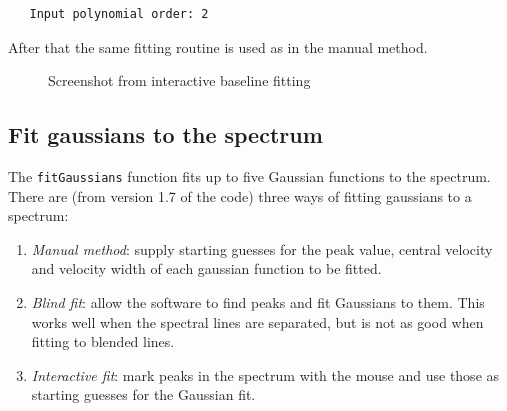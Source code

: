 \documentclass[11pt,a4paper]{article}
\begin{document}
\begin{lstlisting}
   Input polynomial order: 2
\end{lstlisting}
\noindent
After that the same fitting routine is used as in the manual method. 

\begin{figure}[h!]
  \centering
  \caption{Screenshot from interactive baseline fitting}
  \label{fig:interbaseline}
\end{figure}


\subsection{Fit gaussians to the spectrum}
\label{sec:fit-gauss-spectr}

The \texttt{fitGaussians} function fits up to five Gaussian functions
to the spectrum. There are (from version 1.7 of the code) three ways of
fitting gaussians to a spectrum:
\begin{enumerate}
\item \emph{Manual method}: supply starting guesses for the peak value,
  central velocity and
  velocity width of each gaussian function to be fitted. 
\item \emph{Blind fit}: allow the software to find peaks and fit
  Gaussians to them. This works well when the spectral lines are
  separated, but is not as good when fitting to blended lines.
\item \emph{Interactive fit}: mark peaks in the spectrum with the
  mouse and use those as starting guesses for the Gaussian fit. 
\end{enumerate}
\end{document}
